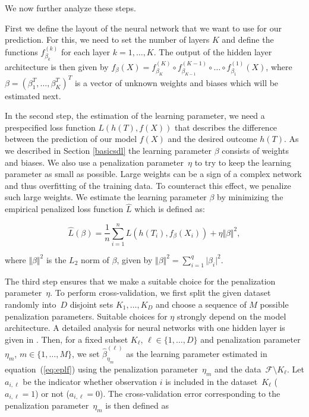 \documentclass[12pt, a4paper]{scrartcl}
\theoremstyle{definition}
\theoremstyle{plain}
\numberwithin{equation}{section}
\numberwithin{figure}{section}
\numberwithin{table}{section}
\begin{document}
	We now further analyze these steps.

	First we define the layout of the neural network that we want to use for our prediction.
	For this, we need to set the number of layers $K$ and define the functions $f_{\beta_k}^{(k)}$ for each layer $k = 1, \dots, K$.
	The output of the hidden layer architecture is then given by $f_{\beta}(X) = f_{\beta_K}^{(K)} \circ f_{\beta_{K-1}}^{(K-1)} \circ \dots \circ f_{\beta_1}^{(1)}(X)$, where $\beta = (\beta_1^T, \dots, \beta_K^T)^T$ is a vector of unknown weights and biases which will be estimated next.
	
	In the second step, the estimation of the learning parameter, we need a prespecified loss function $L(h(T), f(X))$ that describes the difference between the prediction of our model $f(X)$ and the desired outcome $h(T)$.
	As we described in Section \ref{basicsdl} the learning parameter $\beta$ consists of weights and biases.
	We also use a penalization parameter~$\eta$ to try to keep the learning parameter as small as possible.
	Large weights can be a sign of a complex network and thus overfitting of the training data.
	To counteract this effect, we penalize such large weights.
	We estimate the learning parameter $\beta$ by minimizing the empirical penalized loss function $\hat{L}$ which is defined as:
	
	\begin{equation}\label{eq:eplf}
	\hat{L}(\beta) = \frac{1}{n} \sum_{i=1}^n L( h(T_i), f_{\beta}(X_i)) + \eta \Vert \beta \Vert ^2,
	\end{equation}
	
	where $\Vert \beta \Vert ^2$ is the $L_2$ norm of $\beta$, given by $\Vert \beta \Vert ^2 = \sum_{i=1}^q \vert \beta _i \vert ^2.$
	
	The third step ensures that we make a suitable choice for the penalization parameter~$\eta$.
	To perform cross-validation, we first split the given dataset randomly into~$D$ disjoint sets $K_1,\dots, K_D$ and choose a sequence of $M$ possible penalization parameters.
	Suitable choices for $\eta$ strongly depend on the model architecture.
	A detailed analysis for neural networks with one hidden layer is given in \citet*{regpar}. 
	Then, for a fixed subset $K_{\ell}$, $\ell \in \{1,\dots,D\}$ and penalization parameter $\eta_m$, $m \in \{1,\dots,M\}$, we set $\hat{\beta}_{\eta_{m}}^{(\ell)}$ as the learning parameter estimated in equation~(\ref{eq:eplf}) using the penalization parameter~$\eta_m$ and the data~$\mathcal{F} \setminus K_{\ell}$.
	Let $a_{i,\ell}$ be the indicator whether observation $i$ is included in the dataset~$K_\ell$ ($a_{i,\ell} = 1$) or not ($a_{i,\ell}=0$).
	The cross-validation error corresponding to the penalization parameter~$\eta_m$ is then defined as
	
\end{document}

